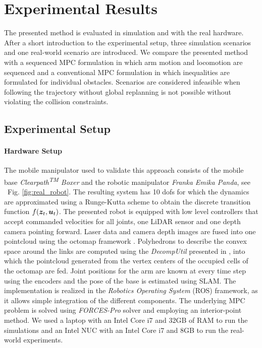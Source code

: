 \section{Experimental Results}
\label{experimental_results}

The presented method is evaluated in simulation and with the real hardware. After a short introduction to the experimental setup, three simulation scenarios and one real-world scenario are introduced. We compare the presented method with a sequenced MPC formulation in which arm motion and locomotion are sequenced and a conventional MPC formulation in which inequalities are formulated for individual obstacles. Scenarios are considered infeasible when following the trajectory without global replanning is not possible without violating the collision constraints.
%
\subsection{Experimental Setup}%
\label{sub:experimental_setup}

\paragraph{Hardware Setup}
The mobile manipulator used to validate this approach consists of the mobile base \textit{Clearpath\textsuperscript{TM} Boxer} and the robotic manipulator \textit{Franka Emika Panda}, see ~{Fig. \ref{fig:real_robot}}. The
resulting system has 10 \acp{dof} for which
the dynamics are approximated using a Runge-Kutta scheme to
obtain the discrete transition function $f(\bm{z}_t, \bm{u}_t)$.
The presented robot is equipped with low level controllers that accept commanded velocities
for all joints, one LiDAR sensor  and one
depth camera pointing forward. Laser data and camera depth images are fused into one
pointcloud using the octomap framework \cite{Hornung2013}. Polyhedrons to describe the
convex space around the links are computed using the \textit{DecompUtil} presented in
\cite{Liu2017}, into which the pointcloud generated from the vertex centers of the
occupied cells of the octomap are fed.
Joint positions for the arm are known at every time step using the encoders and the pose
of the base is estimated using SLAM.
The implementation is realized in the \textit{Robotics Operating System} (ROS) framework, as it
allows simple integration of the different components. The underlying MPC
problem is solved using \textit{FORCES-Pro} solver \cite{forcespro} and employing an interior-point method\cite{FORCESNLP}. We used a laptop with an Intel Core i7 and 32GB of RAM to run the simulations and an Intel NUC with an Intel Core i7 and 8GB to run the real-world experiments.


